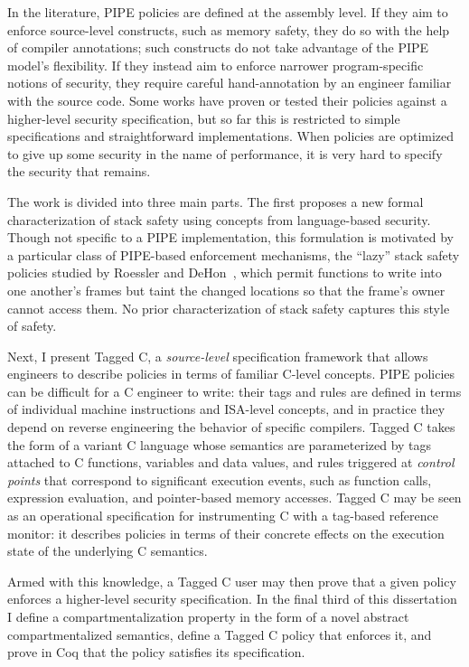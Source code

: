 \documentclass{report}
\begin{document}
In the literature, PIPE policies are defined at the assembly level. If they aim to enforce
source-level constructs, such as memory safety, they do so with the help of compiler annotations;
such constructs do not take advantage of the PIPE model's flexibility. If they instead
aim to enforce narrower program-specific notions of security, they require careful hand-annotation
by an engineer familiar with the source code. Some works have proven or tested their policies
against a higher-level security specification, but so far this is restricted to simple specifications
and straightforward implementations. When policies are optimized to give up some security in the name
of performance, it is very hard to specify the security that remains.

The work is divided into three main parts. The first proposes a new formal characterization of
stack safety using concepts from language-based security. Though not specific to a PIPE
implementation, this formulation is motivated by a particular class of PIPE-based enforcement
mechanisms, the ``lazy'' stack safety policies studied by Roessler and DeHon~\cite{RoesslerD18},
which permit functions to write into one another's frames but taint the changed locations so that the
frame's owner cannot access them. No prior characterization of stack safety captures this style of
safety.

Next, I present Tagged C, a \emph{source-level}
specification framework that allows engineers to describe policies in terms of familiar
C-level concepts. PIPE policies can be difficult for a C engineer to write: their tags and rules
are defined in terms of individual machine instructions and ISA-level
concepts, and in practice they depend on reverse engineering the behavior
of specific compilers. Tagged C takes the form of a variant C language whose semantics are
parameterized by tags attached to C functions, variables and data values, and rules triggered at
\emph{control points} that correspond to significant execution events, such as function calls,
expression evaluation, and pointer-based memory accesses.
Tagged C may be seen as an operational specification for instrumenting C with a
tag-based reference monitor: it describes policies in terms of their concrete effects
on the execution state of the underlying C semantics.

Armed with this knowledge, a Tagged C user may then prove that a given policy enforces
a higher-level security specification. In the final third of this dissertation I define
a compartmentalization property in the form of
a novel abstract compartmentalized semantics, define a Tagged C policy that enforces it,
and prove in Coq that the policy satisfies its specification.
\end{document}
